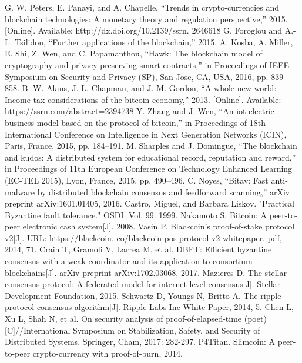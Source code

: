 \documentclass[]{article}
\begin{document}
\begin{CJK*}{UTF8}{gbsn}
	\begin{thebibliography}{99}
	G. W. Peters, E. Panayi, and A. Chapelle, “Trends in crypto-currencies and blockchain technologies: A monetary theory and regulation perspective,” 2015. [Online]. Available: http://dx.doi.org/10.2139/ssrn. 2646618
G. Foroglou and A.-L. Tsilidou, “Further applications of the blockchain,” 2015.
A. Kosba, A. Miller, E. Shi, Z. Wen, and C. Papamanthou, “Hawk: The blockchain model of cryptography and privacy-preserving smart contracts,” in Proceedings of IEEE Symposium on Security and Privacy (SP), San Jose, CA, USA, 2016, pp. 839–858.
B. W. Akins, J. L. Chapman, and J. M. Gordon, “A whole new world: Income tax considerations of the bitcoin economy,” 2013. [Online]. Available: https://ssrn.com/abstract=2394738
Y. Zhang and J. Wen, “An iot electric business model based on the protocol of bitcoin,” in Proceedings of 18th International Conference on Intelligence in Next Generation Networks (ICIN), Paris, France, 2015, pp. 184–191.
M. Sharples and J. Domingue, “The blockchain and kudos: A distributed system for educational record, reputation and reward,” in Proceedings of 11th European Conference on Technology Enhanced Learning (EC-TEL 2015), Lyon, France, 2015, pp. 490–496.
C. Noyes, “Bitav: Fast anti-malware by distributed blockchain consensus
and feedforward scanning,” arXiv preprint arXiv:1601.01405, 2016.
 Castro, Miguel, and Barbara Liskov. "Practical Byzantine fault tolerance." OSDI. Vol. 99. 1999.
 Nakamoto S. Bitcoin: A peer-to-peer electronic cash system[J]. 2008.
 Vasin P. Blackcoin’s proof-of-stake protocol v2[J]. URL: https://blackcoin. co/blackcoin-pos-protocol-v2-whitepaper. pdf, 2014, 71.
 Crain T, Gramoli V, Larrea M, et al. DBFT: Efficient byzantine consensus with a weak coordinator and its application to consortium blockchains[J]. arXiv preprint arXiv:1702.03068, 2017.
 Mazieres D. The stellar consensus protocol: A federated model for internet-level consensus[J]. Stellar Development Foundation, 2015.
 Schwartz D, Youngs N, Britto A. The ripple protocol consensus algorithm[J]. Ripple Labs Inc White Paper, 2014, 5.
 Chen L, Xu L, Shah N, et al. On security analysis of proof-of-elapsed-time (poet)[C]//International Symposium on Stabilization, Safety, and Security of Distributed Systems. Springer, Cham, 2017: 282-297.
 P4Titan. Slimcoin: A peer-to-peer crypto-currency with proof-of-burn, 2014.

\end{thebibliography}
\end{CJK*}
\end{document}
